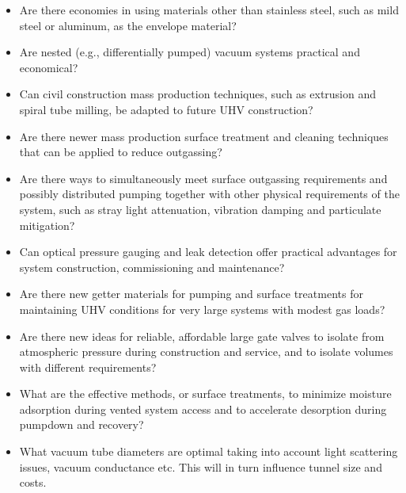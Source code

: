 \begin{itemize}
\item  Are there economies in using materials other than stainless steel, such as mild steel or aluminum, as the envelope material? %
\item Are nested (e.g., differentially pumped) vacuum systems practical and economical? 

\item Can civil construction mass production techniques, such as extrusion and spiral tube milling, be adapted to future UHV construction?

\item Are there newer mass production surface treatment and cleaning techniques that can be applied to reduce outgassing? %

\item Are there ways to simultaneously meet surface outgassing requirements and possibly distributed pumping together with other physical requirements of the system, such as 
stray light attenuation, vibration damping and particulate mitigation?

\item Can optical pressure gauging and leak detection offer practical advantages for system construction, commissioning and maintenance?

\item Are there new getter materials for pumping and surface treatments for maintaining UHV conditions for very large systems with modest gas loads?

\item Are there new ideas for reliable, affordable large gate valves to isolate from atmospheric pressure during construction and service, and to isolate volumes with different requirements?

\item What are the effective methods, or surface treatments, to minimize moisture adsorption during vented system access and to accelerate desorption during pumpdown and recovery?

\item What vacuum tube diameters are optimal taking into account light scattering issues, vacuum conductance etc. This will in turn influence tunnel size and costs.

\end{itemize}

